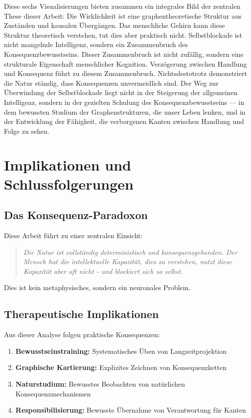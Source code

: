 \documentclass[12pt,a4paper]{article}
\begin{document}
Diese sechs Visualisierungen bieten zusammen ein integrales Bild der zentralen These dieser Arbeit: Die Wirklichkeit ist eine graphentheoretische Struktur aus Zuständen und kausalen Übergängen. Das menschliche Gehirn kann diese Struktur theoretisch verstehen, tut dies aber praktisch nicht. Selbstblockade ist nicht mangelnde Intelligenz, sondern ein Zusammenbruch des Konsequenzbewusstseins. Dieser Zusammenbruch ist nicht zufällig, sondern eine strukturale Eigenschaft menschlicher Kognition. Verzögerung zwischen Handlung und Konsequenz führt zu diesem Zusammenbruch. Nichtsdestotrotz demonstriert die Natur ständig, dass Konsequenzen unvermeidlich sind. Der Weg zur Überwindung der Selbstblockade liegt nicht in der Steigerung der allgemeinen Intelligenz, sondern in der gezielten Schulung des Konsequenzbewusstseins — in dem bewussten Studium der Graphenstrukturen, die unser Leben lenken, und in der Entwicklung der Fähigkeit, die verborgenen Kanten zwischen Handlung und Folge zu sehen.

\section{Implikationen und Schlussfolgerungen}

\subsection{Das Konsequenz-Paradoxon}

Diese Arbeit führt zu einer zentralen Einsicht:

\begin{quote}
\textit{Die Natur ist vollständig deterministisch und konsequenzgebunden. Der Mensch hat die intellektuelle Kapazität, dies zu verstehen, nutzt diese Kapazität aber oft nicht - und blockiert sich so selbst.}
\end{quote}

Dies ist kein metaphysisches, sondern ein neuronales Problem.

\subsection{Therapeutische Implikationen}

Aus dieser Analyse folgen praktische Konsequenzen:

\begin{enumerate}
    \item \textbf{Bewusstseinstraining:} Systematisches Üben von Langzeitprojektion
    \item \textbf{Graphische Kartierung:} Explizites Zeichnen von Konsequenzketten
    \item \textbf{Naturstudium:} Bewusstes Beobachten von natürlichen Konsequenzmechanismen
    \item \textbf{Responsibilisierung:} Bewusste Übernahme von Verantwortung für Kanten
\end{enumerate}
\end{document}
